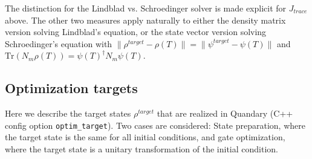 \documentclass[11pt]{article}
\begin{document}
The distinction for the Lindblad vs. Schroedinger solver is made explicit for $J_{trace}$ above. The other two measures apply naturally to either the density matrix version solving Lindblad's equation, or the state vector version solving Schroedinger's equation with $ \|\rho^{target} - \rho(T)\| = \|\psi^{target} - \psi(T)\|$ and $\mbox{Tr}\left(N_m\rho(T)\right) = \psi(T)^\dagger N_m \psi(T)$. 



\subsection{Optimization targets} \label{sec:targets}
Here we describe the target states $\rho^{target}$ that are realized in Quandary (C++ config option \texttt{optim\_target}). Two cases are considered: State preparation, where the target state is the same for all initial conditions, and gate optimization, where the target state is a unitary transformation of the initial condition. 
\end{document}
